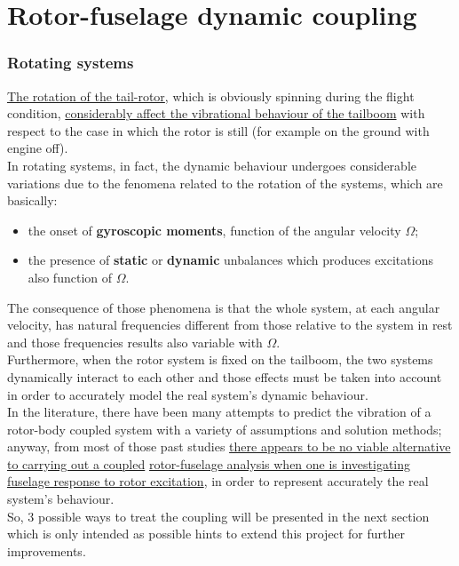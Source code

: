 \chapter{Rotor-fuselage dynamic coupling}
\label{ch:Rotor-fuselage dynamic coupling}

\subsection*{Rotating systems}
\noindent
\underline{The rotation of the tail-rotor}, which is obviously spinning during the flight condition, \underline{considerably affect the vibrational behaviour of the tailboom} with respect to the case in which the rotor is still (for example on the ground with engine off). \\
In rotating systems, in fact, the dynamic behaviour undergoes considerable variations due to the fenomena related to the rotation of the systems, which are basically:
\begin{itemize}
	\item the onset of \textbf{gyroscopic moments}, function of the angular velocity $\Omega$;
	\item the presence of \textbf{static} or \textbf{dynamic} unbalances which produces excitations also function of $\Omega$. 
\end{itemize}

\noindent
The consequence of those phenomena is that the whole system, at each angular velocity, has natural frequencies different from those relative to the system in rest and those frequencies results also variable with $\Omega$. \\
\noindent
Furthermore, when the rotor system is fixed on the tailboom, the two systems dynamically interact to each other and those effects must be taken into account in order to accurately model the real system's dynamic behaviour. \\

\noindent
In the literature, there have been many attempts to predict the vibration of a rotor-body coupled system with a variety of assumptions and solution methods; anyway, from most of those past studies \underline{there appears to be no viable alternative to carrying out a coupled} \underline{rotor-fuselage analysis when one is investigating fuselage response to rotor excitation}, in order to represent accurately the real system's behaviour. \\

\noindent
So, 3 possible ways to treat the coupling will be presented in the next section which is only intended as possible hints to extend this project for further improvements.  


